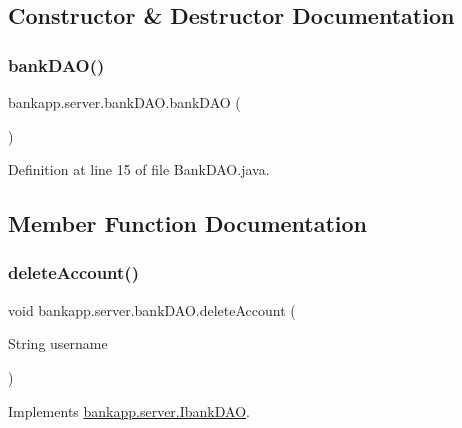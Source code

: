 \subsection{Constructor \& Destructor Documentation}
\mbox{\label{classbankapp_1_1server_1_1bank_d_a_o_a974c7da6eea192fb2f94a98a66e5068a}} 
\subsubsection{\texorpdfstring{bank\+D\+A\+O()}{bankDAO()}}
{\footnotesize\ttfamily bankapp.\+server.\+bank\+D\+A\+O.\+bank\+D\+AO (\begin{DoxyParamCaption}{ }\end{DoxyParamCaption})}



Definition at line 15 of file Bank\+D\+A\+O.\+java.



\subsection{Member Function Documentation}
\mbox{\label{classbankapp_1_1server_1_1bank_d_a_o_a3c6e87d45ba675ea26be1d7227de0183}} 
\subsubsection{\texorpdfstring{delete\+Account()}{deleteAccount()}}
{\footnotesize\ttfamily void bankapp.\+server.\+bank\+D\+A\+O.\+delete\+Account (\begin{DoxyParamCaption}\item[{String}]{username }\end{DoxyParamCaption})}



Implements \hyperlink{interfacebankapp_1_1server_1_1_ibank_d_a_o_a618b28f4d950f4d2705745c13d7be470}{bankapp.\+server.\+Ibank\+D\+AO}.



